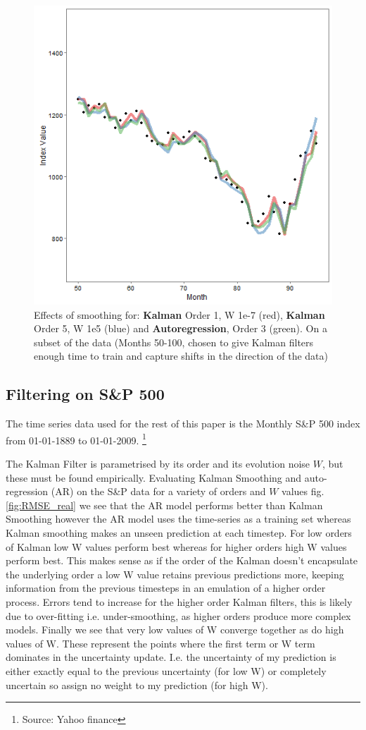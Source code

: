\documentclass{sig-alternate-05-2015}
\begin{document}
\begin{figure}[ht]
		
				\includegraphics[width=0.7\linewidth]{DifferentModels.png}
	\centering
	\caption{Effects of smoothing for: \textbf{Kalman} Order 1, W 1e-7 (red), \textbf{Kalman} Order 5, W 1e5 (blue) and \textbf{Autoregression}, Order 3 (green). On a subset of the data (Months 50-100, chosen to give Kalman filters enough time to train and capture shifts in the direction of the data)}
			\label{fig:DifferentModels}
\end{figure}

\subsection{Filtering on S\&P 500}
The time series data used for the rest of this paper is the Monthly S\&P 500 index from 01-01-1889 to 01-01-2009. \footnote{Source: Yahoo finance}

The Kalman Filter is parametrised by its order and its evolution noise $W$, but these must be found empirically. Evaluating Kalman Smoothing and auto-regression (AR) on the S\&P data for a variety of orders and $W$ values fig. \ref{fig:RMSE_real} we see that the AR model performs better than Kalman Smoothing however the AR model uses the time-series as a training set whereas Kalman smoothing makes an unseen prediction at each timestep. 
For low orders of Kalman low W values perform best whereas for higher orders high W values perform best. This makes sense as if the order of the Kalman doesn't encapsulate the underlying order a low W value retains previous predictions more, keeping information from the previous timesteps in an emulation of a higher order process. Errors tend to increase for the higher order Kalman filters, this is likely due to over-fitting i.e. under-smoothing, as higher orders produce more complex models.  Finally we see that very low values of W converge together as do high values of W. These represent the points where the first term or W term dominates in the uncertainty update. I.e. the uncertainty of my prediction is either exactly equal to the previous uncertainty (for low W) or completely uncertain so assign no weight to my prediction (for high W).  
\end{document}
